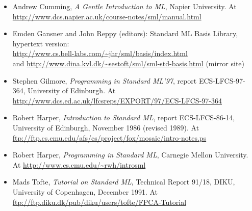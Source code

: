 \documentclass[fleqn,a4paper]{article}
\begin{document}
\begin{itemize}
\item Andrew Cumming, \emph{A Gentle Introduction to ML}, Napier
  University.  At\\
  \url{http://www.dcs.napier.ac.uk/course-notes/sml/manual.html}

\item Emden Gansner and John Reppy (editors): Standard ML Basis
  Library, hypertext version:\\ 
  \url{http://www.cs.bell-labs.com/~jhr/sml/basis/index.html} \\
and  \url{http://www.dina.kvl.dk/~sestoft/sml/sml-std-basis.html}
  (mirror site)
  
\item Stephen Gilmore, \emph{Programming in Standard ML'97}, report
  ECS-LFCS-97-364, University of Edinburgh.  At
  \url{http://www.dcs.ed.ac.uk/lfcsreps/EXPORT/97/ECS-LFCS-97-364}
  
\item Robert Harper, {\em Introduction to Standard ML\/}, report
  ECS-LFCS-86-14, University of Edinburgh, November 1986 (revised
  1989).  At
  \url{ftp://ftp.cs.cmu.edu/afs/cs/project/fox/mosaic/intro-notes.ps}

\item Robert Harper, \emph{Programming in Standard ML}, Carnegie
        Mellon University.  At
        \url{http://www.cs.cmu.edu/~rwh/introsml}

\item Mads Tofte, {\em Tutorial on Standard ML\/}, Technical Report
  91/18, DIKU, University of Copenhagen, December 1991.  At 
  \url{ftp://ftp.diku.dk/pub/diku/users/tofte/FPCA-Tutorial}
\end{itemize}



\end{document}
